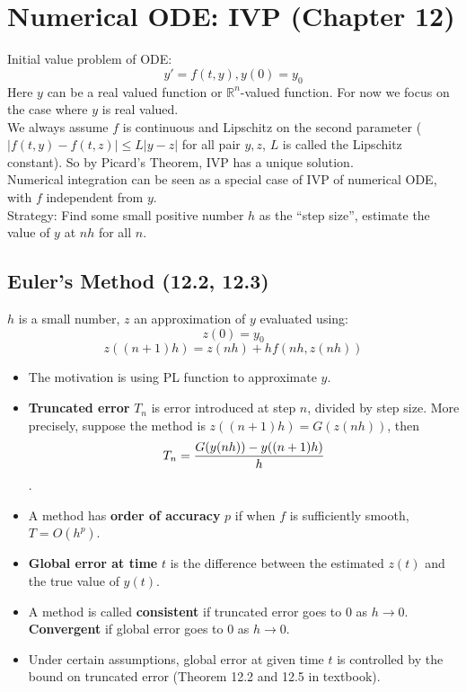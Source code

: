 \documentclass[20pt]{article} %
\theoremstyle{break}
\begin{document}
\newpage

\section{Numerical ODE: IVP (Chapter 12)}

Initial value problem of ODE:
\[y'=f(t, y), y(0)=y_0\]
Here $y$ can be a real valued function or $\mathbb{R}^n$-valued function. For now we focus on the case where $y$ is real valued.\\

We always assume $f$ is continuous and Lipschitz on the second parameter ($|f(t, y)-f(t, z)|\leq L|y-z|$ for all pair $y, z$, $L$ is called the Lipschitz constant). So by Picard's Theorem, IVP has a unique solution.\\

Numerical integration can be seen as a special case of IVP of numerical ODE, with $f$ independent from $y$.\\

Strategy: Find some small positive number $h$ as the ``step size'', estimate the value of $y$ at $nh$ for all $n$.\\

\newpage

\subsection{Euler's Method (12.2, 12.3)}

$h$ is a small number, $z$ an approximation of $y$ evaluated using:
\[z(0)=y_0\]
\[z((n+1)h)=z(nh)+hf(nh, z(nh))\]

\begin{itemize}
\item The motivation is using PL function to approximate $y$.
\item {\bf Truncated error} $T_n$ is error introduced at step $n$, divided by step size. More precisely, suppose the method is $z((n+1)h)=G(z(nh))$, then
  \[T_n={G(y(nh))-y((n+1)h)\over h}\]. 
\item A method has {\bf order of accuracy} $p$ if when $f$ is sufficiently smooth, $T=O(h^p)$.
\item {\bf Global error at time} $t$ is the difference between the estimated $z(t)$ and the true value of $y(t)$.
\item A method is called {\bf consistent} if truncated error goes to $0$ as $h\rightarrow 0$. {\bf Convergent} if global error goes to $0$ as $h\rightarrow 0$.
\item Under certain assumptions, global error at given time $t$ is controlled by the bound on truncated error (Theorem 12.2 and 12.5 in textbook).
\end{itemize}
\end{document}
